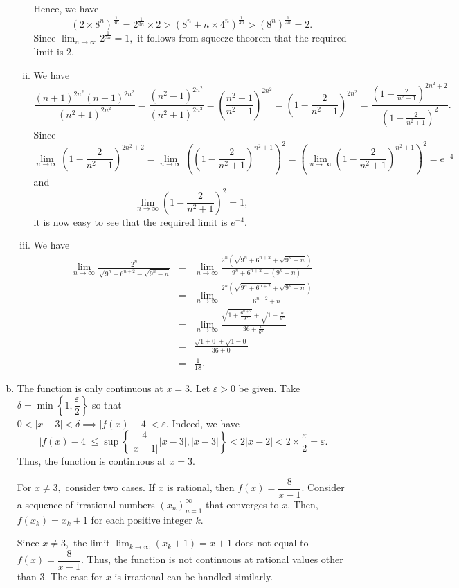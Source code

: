 \documentclass{article}
\begin{document}
\begin{enumerate}[(a)]
\begin{enumerate}[(i)]
        Hence, we have $$(2\times8^n)^{\frac{1}{3n}}=2^{\frac{1}{3n}}\times2>(8^n+n\times4^n)^{\frac{1}{3n}}>(8^n)^{\frac{1}{3n}}=2.$$
        Since $\displaystyle\lim_{n\to\infty}2^{\frac{1}{3n}}=1,$ it follows from squeeze theorem that the required limit is 2.
        \item We have
        $$\frac{(n+1)^{2n^2}(n-1)^{2n^2}}{(n^2+1)^{2n^2}}=\frac{(n^2-1)^{2n^2}}{(n^2+1)^{2n^2}}=\left(\frac{n^2-1}{n^2+1}\right)^{2n^2}
        =\left(1-\frac{2}{n^2+1}\right)^{2n^2}
        =\frac{\left(1-\frac{2}{n^2+1}\right)^{2n^2+2}}{\left(1-\frac{2}{n^2+1}\right)^{2}}.$$
        Since $$\lim_{n\to\infty}\left(1-\frac{2}{n^2+1}\right)^{2n^2+2}=\lim_{n\to\infty}\left(\left(1-\frac{2}{n^2+1}\right)^{n^2+1}\right)^2=\left(\lim_{n\to\infty}\left(1-\frac{2}{n^2+1}\right)^{n^2+1}\right)^2=e^{-4}$$ and $$\lim_{n\to\infty}\left(1-\frac{2}{n^2+1}\right)^{2}=1,$$
        it is now easy to see that the required limit is $e^{-4}.$
        \item We have \begin{eqnarray*}\lim_{n\to\infty}\frac{2^n}{\sqrt{9^n+6^{n+2}}-\sqrt{9^n-n}}&=&\lim_{n\to\infty}\frac{2^n\left(\sqrt{9^n+6^{n+2}}+\sqrt{9^n-n}\right)}{9^n+6^{n+2}-(9^n-n)}\\
        &=&\lim_{n\to\infty}\frac{2^n\left(\sqrt{9^n+6^{n+2}}+\sqrt{9^n-n}\right)}{6^{n+2}+n}\\
        &=&\lim_{n\to\infty}\frac{\sqrt{1+\frac{6^{n+2}}{9^n}}+\sqrt{1-\frac{n}{9^n}}}{36+\frac{n}{6^n}}\\
        &=&\frac{\sqrt{1+0}+\sqrt{1-0}}{36+0}\\
        &=&\frac{1}{18}.
        \end{eqnarray*}
    \end{enumerate}
    \item The function is only continuous at $x=3.$ Let $\varepsilon>0$ be given. Take $\delta=\min\left\{1,\dfrac{\varepsilon}{2}\right\}$ so that\\ $0<|x-3|<\delta\implies |f(x)-4|<\varepsilon.$ Indeed, we have $$ |f(x)-4|\leq \sup\left\{\frac{4}{|x-1|}|x-3|,|x-3|\right\}<2|x-2|<2\times\frac{\varepsilon}{2}=\varepsilon.$$ Thus, the function is continuous at $x=3.$
    
    For $x\neq3,$ consider two cases. If $x$ is rational, then $f(x)=\dfrac{8}{x-1}.$ Consider a sequence of irrational numbers $(x_n)^{\infty}_{n=1}$ that converges to $x.$ Then, $f(x_k)=x_k+1$ for each positive integer $k.$ 
    
    Since $x\neq 3,$ the limit $\displaystyle\lim_{k\to\infty}(x_k+1)=x+1$ does not equal to $f(x)=\dfrac{8}{x-1}.$ Thus, the function is not continuous at rational values other than 3. The case for $x$ is irrational can be handled similarly.
\end{enumerate}
\end{document}
